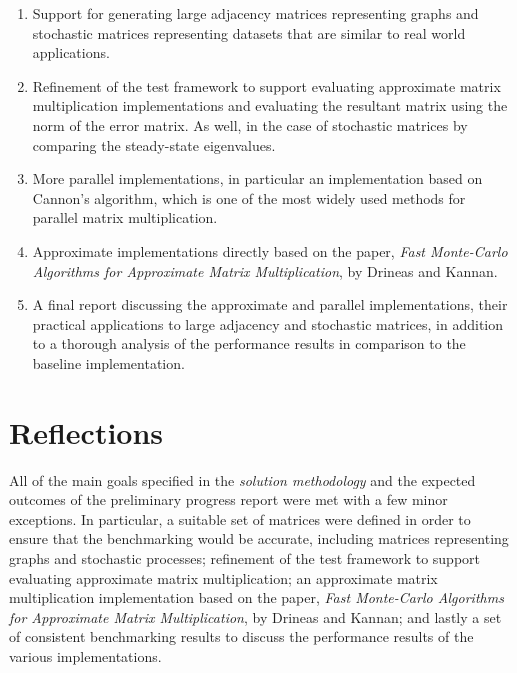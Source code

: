 \documentclass[oneside]{article}
\begin{document}
\begin{enumerate}
\item Support for generating large adjacency matrices representing graphs and stochastic matrices representing datasets that are similar to real world applications.

\item Refinement of the test framework to support evaluating approximate matrix multiplication implementations and evaluating the resultant matrix using the norm of the error matrix. As well, in the case of stochastic matrices by comparing the steady-state eigenvalues.

\item More parallel implementations, in particular an implementation based on Cannon's algorithm, which is one of the most widely used methods for parallel matrix multiplication.

\item Approximate implementations directly based on the paper, \emph{Fast Monte-Carlo Algorithms for Approximate Matrix Multiplication}\cite{drineas2001fast}, by Drineas and Kannan.

\item A final report discussing the approximate and parallel implementations, their practical applications to large adjacency and stochastic matrices, in addition to a thorough analysis of the performance results in comparison to the baseline implementation.

\end{enumerate}




\section{Reflections}


All of the main goals specified in the \emph{solution methodology} and the expected outcomes of the preliminary progress report were met with a few minor exceptions. In particular, a suitable set of matrices were defined in order to ensure that the benchmarking would be accurate, including matrices representing graphs and stochastic processes; refinement of the test framework to support evaluating approximate matrix multiplication; an approximate matrix multiplication implementation based on the paper, \emph{Fast Monte-Carlo Algorithms for Approximate Matrix Multiplication}\cite{drineas2001fast}, by Drineas and Kannan; and lastly a set of consistent benchmarking results to discuss the performance results of the various implementations.
\end{document}
